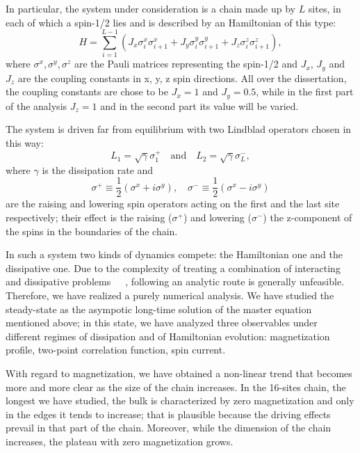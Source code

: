 \documentclass[12pt]{extarticle}
\begin{document}
In particular, the system under consideration is a chain made up by $L$ sites, in each of which a spin-1/2 lies and is described by an Hamiltonian of this type:
\begin{equation*}
    H = \sum_{i = 1}^{L-1} (J_x\sigma_i^x\sigma_{i+1}^x + J_y\sigma_i^y \sigma_{i+1}^y + J_z \sigma_i^z \sigma_{i+1}^z),
\end{equation*}
where $\sigma^x, \sigma^y, \sigma^z$ are the Pauli matrices representing the spin-1/2 and $J_x$, $J_y$ and $J_z$ are the coupling constants in x, y, z spin directions. All over the dissertation, the coupling constants are chose to be $J_x = 1$ and $J_y = 0.5$, while in the first part of the analysis $J_z = 1$ and in the second part its value will be varied.

The system is driven far from equilibrium with two Lindblad operators chosen in this way:
\begin{equation*}
    L_1 = \sqrt{\gamma} \sigma_1^+ \quad \text{and} \quad L_2 =\sqrt{\gamma}\sigma_L^-,
\end{equation*}
where $\gamma$ is the dissipation rate and 
\begin{equation*}
    \sigma^+ \equiv \frac{1}{2}(\sigma^x + i\sigma^y), \quad \sigma^- \equiv \frac{1}{2}(\sigma^x - i\sigma^y)
\end{equation*}
are the raising and lowering spin operators acting on the first and the last site respectively; their effect is the raising ($\sigma^+$) and lowering ($\sigma^-$) the z-component of the spins in the boundaries of the chain. 


In such a system two kinds of dynamics compete: the Hamiltonian one and the dissipative one. Due to the complexity of treating a combination of interacting and dissipative problems~\cite{phase_trans_spin_system}~\cite{Lee_Haffner_Cross}~\cite{savona}, following an analytic route is generally unfeasible. Therefore, we have realized a purely numerical analysis. We have studied the steady-state as the asympotic long-time solution of the master equation mentioned above; in this state, we have analyzed three observables under different regimes of dissipation and of Hamiltonian evolution: magnetization profile, two-point correlation function, spin current. 

With regard to magnetization, we have obtained a non-linear trend that becomes more and more clear as the size of the chain increases. In the 16-sites chain, the longest we have studied, the bulk is characterized by zero magnetization and only in the edges it tends to increase; that is plausible because the driving effects prevail in that part of the chain. Moreover, while the dimension of the chain increases, the plateau with zero magnetization grows. 
\end{document}
